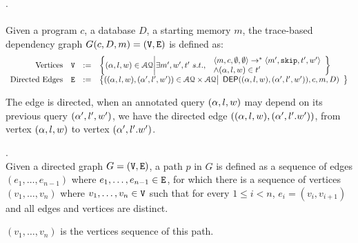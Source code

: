 \documentclass[a4paper,11pt]{article}
\begin{document}
\begin{defn}.
\label{def:trace-based_graph}
\\
\\
Given a program $c$, a database $D$, a starting memory $m$, the trace-based dependency graph $G(c,D,m) = (\mathtt{V}, \mathtt{E})$ is defined as: 
%
\[
\begin{array}{rlcl}
	\text{Vertices} &
	\vertxs & := & \left\{ 
	({\qval}, l,w) \in \mathcal{AQ} \middle\vert
	\exists m',  w', t' ~ s.t., ~  
	\begin{array}{l}
	\config{m ,c, \emptyset, \emptyset}  
	\to^{*}  
	\config{m' , \eskip, t', w' } \\ 
	\land ({\qval}, l, w) \in t'
	\end{array}
	\right\}
	\\
	\text{Directed Edges} &
	\edges & := & 
	\left\{ 
	(({\qval},l,w),({\qval}',l',w')) \in \mathcal{AQ} \times \mathcal{AQ} 
	\middle\vert
	\begin{array}{l}
		\mathsf{DEP}(({\qval},l,w), ({\qval}',l',w')),c,m,D) \\
	\end{array}
	\right\}
\end{array}
\]
\end{defn}
The edge is directed, when an annotated query $({\alpha},l,w)$ may depend on its previous query $({\alpha}',l',w')$, we have the directed
edge $(({\alpha},l,w), ({\alpha}',l'.w'))$, 
from vertex $(\alpha,l,w) $ to vertex $({\alpha}',l'.w')$.
%
%
\begin{defn}[Path ($p$)].
\\
Given a directed graph $G = (\mathtt{V}, \mathtt{E})$, a path $p$ in $G$ is defined as a sequence of edges $(e_1, \ldots, e_{n - 1})$ where $ e_1, \ldots, e_{n - 1} \in \mathtt{E}$,
for which there is a sequence of vertices $(v_1, \ldots, v_n)$ where $v_1, \ldots, v_n \in \mathtt{V}$
such that for every $1 \leq i < n$, $e_i=(v_{i},v_{i + 1})$
and all edges and vertices are distinct. 

$(v_1, \ldots, v_n)$ is the vertices sequence of this path.

\end{defn}
%
%
\end{document}

